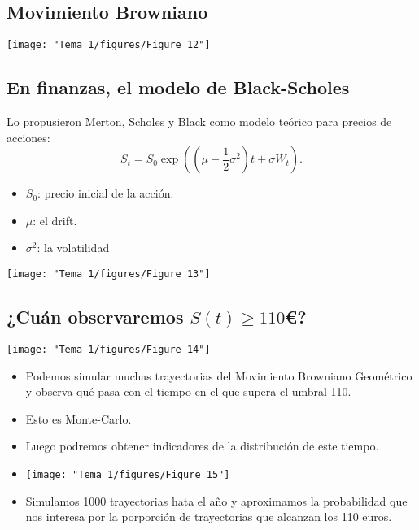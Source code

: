 \subsection{Movimiento Browniano}
\begin{center}
    \texttt{[image: "Tema 1/figures/Figure 12"]}
\end{center}
\subsection{En finanzas, el modelo de Black-Scholes}
\begin{tcolorbox}[colback=blue!5!white, colframe=blue!75!black, title=\textbf{El movimiento Browniano Geométrico:}]
Lo propusieron Merton, Scholes y Black como modelo teórico para precios de acciones: \[
S_t=S_0\exp\left( \left( \mu-\dfrac{1}{2}\sigma^2 \right) t+\sigma W_t \right) .
\] 
\begin{itemize}[label=\textbullet]
    \item $S_0$: precio inicial de la acción.
    \item  $\mu$: el drift.
    \item $\sigma^2$: la volatilidad
\end{itemize}
\end{tcolorbox}
\begin{center}
    \texttt{[image: "Tema 1/figures/Figure 13"]}
\end{center}
\subsection*{¿Cuán observaremos $S(t)\ge 110$€?}
\begin{center}
    \texttt{[image: "Tema 1/figures/Figure 14"]}
\end{center}
\begin{itemize}[label=\textbullet]
    \item Podemos simular muchas trayectorias del Movimiento Browniano Geométrico y observa qué pasa con el tiempo en el que supera el umbral 110.
    \item Esto es Monte-Carlo.
    \item Luego podremos obtener indicadores de la distribución de este tiempo.
\end{itemize}
\begin{itemize}[label=\color{red}\textbullet, leftmargin=*]
    \item {}
        \begin{center}
            \texttt{[image: "Tema 1/figures/Figure 15"]}
        \end{center}
    \item {}

        \begin{tcolorbox}[colback=blue!5!white, colframe=blue!75!black, title=\textbf{Por Monte-Carlo:}]
        Simulamos 1000 trayectorias hata el año y aproximamos la probabilidad que nos interesa por la porporción de trayectorias que alcanzan los 110 euros.
        \end{tcolorbox}
\end{itemize}
